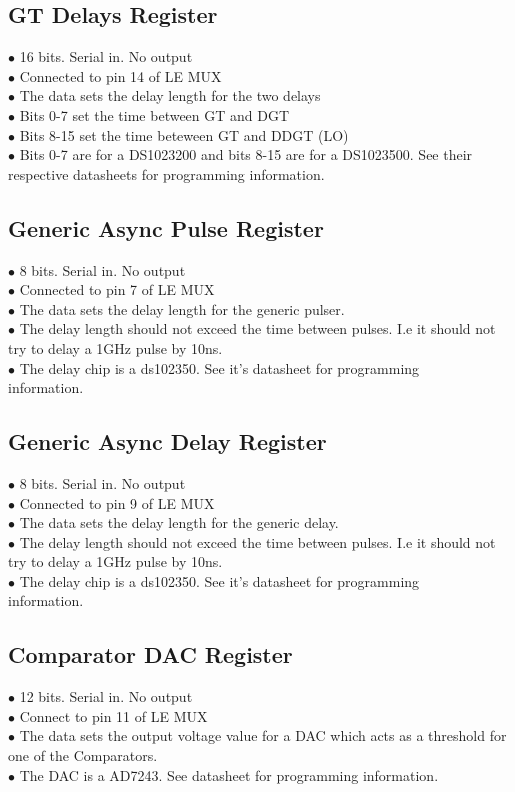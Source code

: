 \documentclass[11pt,a4paper]{article}
\begin{document}
\subsection{GT Delays Register}
$\bullet$ 16 bits. Serial in. No output\\
$\bullet$ Connected to pin 14 of LE MUX\\
$\bullet$ The data sets the delay length for the two delays\\
$\bullet$ Bits 0-7 set the time between GT and DGT\\
$\bullet$ Bits 8-15 set the time beteween GT and DDGT (LO)\\
$\bullet$ Bits 0-7 are for a DS1023200 and bits 8-15 are for a DS1023500. See their respective datasheets for programming information.\\
\subsection{Generic Async Pulse Register}
$\bullet$ 8 bits. Serial in. No output\\
$\bullet$ Connected to pin 7 of LE MUX \\
$\bullet$ The data sets the delay length for the generic pulser. \\
$\bullet$ The delay length should not exceed the time between pulses. I.e it should not try to delay a 1GHz pulse by 10ns.\\
$\bullet$ The delay chip is a ds102350. See it's datasheet for programming\\ information.\\
\subsection{Generic Async Delay Register}
$\bullet$ 8 bits. Serial in. No output \\
$\bullet$ Connected to pin 9 of LE MUX \\
$\bullet$ The data sets the delay length for the generic delay. \\
$\bullet$ The delay length should not exceed the time between pulses. I.e it should not try to delay a 1GHz pulse by 10ns.\\
$\bullet$ The delay chip is a ds102350. See it's datasheet for programming\\ information.\\
\subsection{Comparator DAC Register}
$\bullet$ 12 bits. Serial in. No output \\
$\bullet$ Connect to pin 11 of LE MUX \\
$\bullet$ The data sets the output voltage value for a DAC which acts as a threshold for one of the Comparators. \\
$\bullet$ The DAC is a AD7243. See datasheet for programming information.\\
\end{document}

